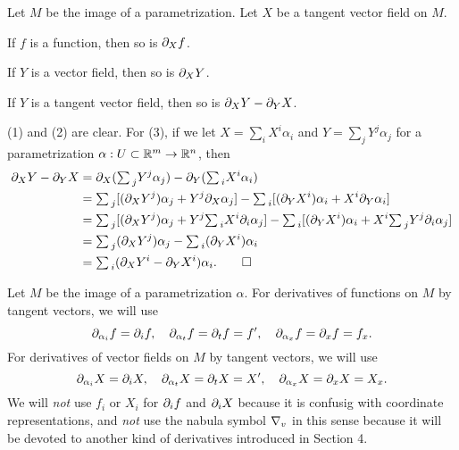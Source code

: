 \documentclass{../exp}
\def\a{\alpha}
\def\ssum{{\textstyle\sum\,}}
\begin{document}
\begin{prop}
Let $M$ be the image of a parametrization.
Let $X$ be a tangent vector field on $M$.
\begin{cond}
\item If $f$ is a function, then so is $\pd_Xf$.
\item If $Y$ is a vector field, then so is $\pd_XY$.
\item If $Y$ is a tangent vector field, then so is $\pd_XY-\pd_YX$.
\end{cond}
\end{prop}
\begin{pf}
(1) and (2) are clear.
For (3), if we let $X=\sum_iX^i\a_i$ and $Y=\sum_jY^j\a_j$ for a parametrization $\a:U\subset\R^m\to\R^n$, then
\begin{align*}
\pd_XY-\pd_YX
&=\pd_X(\ssum_jY^j\a_j)-\pd_Y(\ssum_iX^i\a_i)\\
&=\ssum_j[(\pd_XY^j)\a_j+Y^j\pd_X\a_j]-\ssum_i[(\pd_YX^i)\a_i+X^i\pd_Y\a_i]\\
&=\ssum_j[(\pd_XY^j)\a_j+Y^j\ssum_iX^i\pd_i\a_j]-\ssum_i[(\pd_YX^i)\a_i+X^i\ssum_jY^j\pd_i\a_j]\\
&=\ssum_j(\pd_XY^j)\a_j-\ssum_i(\pd_YX^i)\a_i\\
&=\ssum_i(\pd_XY^i-\pd_YX^i)\a_i.\qedhere
\end{align*}
\end{pf}

\begin{notn*}
Let $M$ be the image of a parametrization $\a$.
For derivatives of functions on $M$ by tangent vectors, we will use
\[\pd_{\a_i}f=\pd_if,\quad\pd_{\a_t}f=\pd_tf=f',\quad\pd_{\a_x}f=\pd_xf=f_x.\]
For derivatives of vector fields on $M$ by tangent vectors, we will use
\[\pd_{\a_i}X=\pd_iX,\quad\pd_{\a_t}X=\pd_tX=X',\quad\pd_{\a_x}X=\pd_xX=X_x.\]
We will \emph{not} use $f_i$ or $X_i$ for $\pd_if$ and $\pd_iX$ because it is confusig with coordinate representations, and \emph{not} use the nabula symbol $\nabla_v$ in this sense because it will be devoted to another kind of derivatives introduced in Section 4.
\end{notn*}
\end{document}
